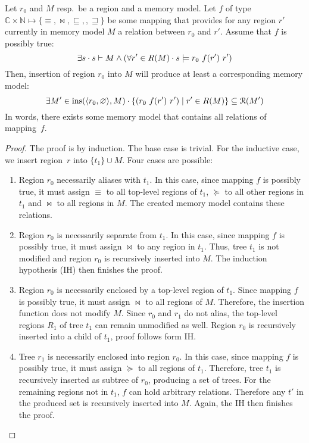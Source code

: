 \begin{lemma}\label{lem:insert}
  Let $r_0$ and $M$ resp.\ be a region and a memory model.
  Let $f$ of type $\mathbb{C} \times \mathbb{N} \mapsto \{ \equiv, \bowtie, \sqsubseteq, , \sqsupseteq \}$ be some mapping that provides for any region $r'$ currently in memory model $M$ a relation between $r_0$ and $r'$.
  Assume that $f$ is possibly true:
  \[
  \exists s \cdot s \vdash M \wedge (\forall r' \in R(M) \cdot s \models r_0~f(r')~r')
  \]
  Then, insertion of region $r_0$ into $M$ will produce at least a corresponding memory model:
  \[
  \exists M' \in \operatorname{ins}(\langle r_0,\varnothing\rangle,M) \cdot \{ (r_0~f(r')~r') \mid r' \in R(M) \} \subseteq \mathcal{R}(M')
  \]
  In words, there exists some memory model that contains all relations of mapping~$f$.
\end{lemma}
\begin{proof}
  The proof is by induction.
  The base case is trivial.
  For the inductive case, we insert region~$r$ into $\{t_1\} \cup M$.
  Four cases are possible:
  \begin{enumerate}[style=unboxed,leftmargin=0cm,labelindent=0pt,wide] %
    \item Region $r_0$ necessarily aliases with $t_1$.
    In this case, since mapping $f$ is possibly true, it must assign $\equiv$ to all top-level regions of $t_1$, $\succeq$ to all other regions in $t_1$ and $\bowtie$ to all regions in $M$.
    The created memory model contains these relations.
    \item Region $r_0$ is necessarily separate from $t_1$.
    In this case, since mapping $f$ is possibly true, it must assign $\bowtie$ to any region in $t_1$.
    Thus, tree $t_1$ is not modified and region $r_0$ is recursively inserted into $M$.
    The induction hypothesis (IH) then finishes the proof.
    \item Region $r_0$ is necessarily enclosed by a top-level region of $t_1$.
    Since mapping $f$ is possibly true, it must assign $\bowtie$ to all regions of $M$.
    Therefore, the insertion function does not modify $M$.
    Since $r_0$ and $r_1$ do not alias, the top-level regions $R_1$ of tree $t_1$ can remain unmodified as well.
    Region $r_0$ is recursively inserted into a child of $t_1$, proof follows form IH.
    \item Tree $r_1$ is necessarily enclosed into region $r_0$.
    In this case, since mapping $f$ is possibly true, it must assign $\succeq$ to all regions of $t_1$.
    Therefore, tree $t_1$ is recursively inserted as subtree of $r_0$, producing a set of trees.
    For the remaining regions not in $t_1$, $f$ can hold arbitrary relations.
    Therefore any $t'$ in the produced set is recursively inserted into $M$.
    Again, the IH then finishes the proof.
  \end{enumerate}
\end{proof}

